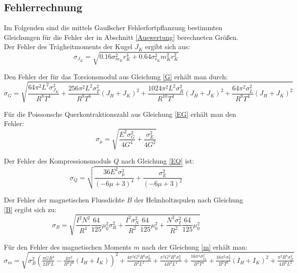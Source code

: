     
  

    
   
      
      
     
      
\newpage
  \subsection{Fehlerrechnung}
    \label{Fehlerrechnung}
    
    Im Folgenden sind die mittels Gaußscher Fehlerfortpflanzung bestimmten Gleichungen für die Fehler
    der in Abschnitt \ref{Auswertung} berechneten Größen.\\
    
    Der Fehler des Trägheitmoments der Kugel $J_{K}$ ergibt sich aus: 
    \[ 
      \sigma_{J_{K}} =\sqrt{0.16 \sigma_{m_{K}}^{2} r_{K}^{4} + 0.64 \sigma_{r_{K}}^{2} m_{K}^{2} r_{K}^{2}}
    \]
    
    Den Fehler der für das Torsionsmodul aus Gleichung \eqref{G} erhält man durch:
    \[
      \sigma_{G} = \sqrt{\frac{64 \pi^{2} L^{2} \sigma_{J_{K}}^{2}}{R^{8} T^{4}} + \frac{256 \pi^{2} L^{2} \sigma_{T}^{2}}{R^{8} T^{6}} \left(J_{H} + J_{K}\right)^{2} +
      \frac{1024 \pi^{2} L^{2} \sigma_{R}^{2}}{R^{10} T^{4}} \left(J_{H} + J_{K}\right)^{2} + \frac{64 \pi^{2} \sigma_{L}^{2}}{R^{8} T^{4}} \left(J_{H} + J_{K}\right)^{2}}
    \]
  
    Für die Poissonsche Querkontraktionszahl aus Gleichung \eqref{EG} erhält man den Fehler:
    \[
      \sigma_{\mu} = \sqrt{\frac{E^{2} \sigma_{G}^{2}}{4 G^{4}} + \frac{\sigma_{E}^{2}}{4 G^{2}}}
    \]
  
    Der Fehler des Kompressionsmoduls $Q$ nach Gleichung \eqref{EQ} ist:
    \[
      \sigma_{Q} = \sqrt{\frac{36 E^{2} \sigma_{\mu}^{2}}{\left(- 6 \mu + 3\right)^{4}} + \frac{\sigma_{E}^{2}}{\left(- 6 \mu + 3\right)^{2}}}
    \]
 
     Der Fehler der magnetischen Flussdichte $B$ der Helmholtzspulen nach Gleichung \eqref{B} ergibt sich zu:
    \[
      \sigma_{B} = \sqrt{\frac{I^{2} N^{2}}{R^{4}} \frac{64}{125}\mu_{0}^{2} \sigma_{R}^{2} + \frac{I^{2} \sigma_{N}^{2}}{R^{2}}\frac{64}{125}\mu_{0}^{2}+ \frac{N^{2} \sigma_{I}^{2}}{R^{2}} \frac{64}{125}\mu_{0}^{2}}
    \]
  
    Für den Fehler des magnetischen Moments $m$ nach der Gleichung \eqref{m} erhält man:\\
  
    $\sigma_{m} = \sqrt{\sigma_{B}^{2} \left(\frac{\pi G R^{4}}{2 B^{2} L} - \frac{ 4\pi^{2} }{B^{2} T^{2}} \left(I_{H} + I_{K}\right)\right)^{2} + \frac{4\pi^{2} G^{2} R^{6} \sigma_{R}^{2}}{B^{2} L^{2}} + 
     \frac{\pi^{2} G^{2} R^{8} \sigma_{L}^{2}}{4 B^{2} L^{4}} + \frac{16\pi^{4} \sigma_{I_{K}}^{2}}{B^{2} T^{4}} +
     \frac{16 \pi^{2} \sigma_{T}^{2}}{B^{2} T^{6}} \left(I_{H} + I_{K}\right)^{2} +  \frac{\pi^{2} R^{8} \sigma_{G}^{2}}{4 B^{2} L^{2}}}$
  
